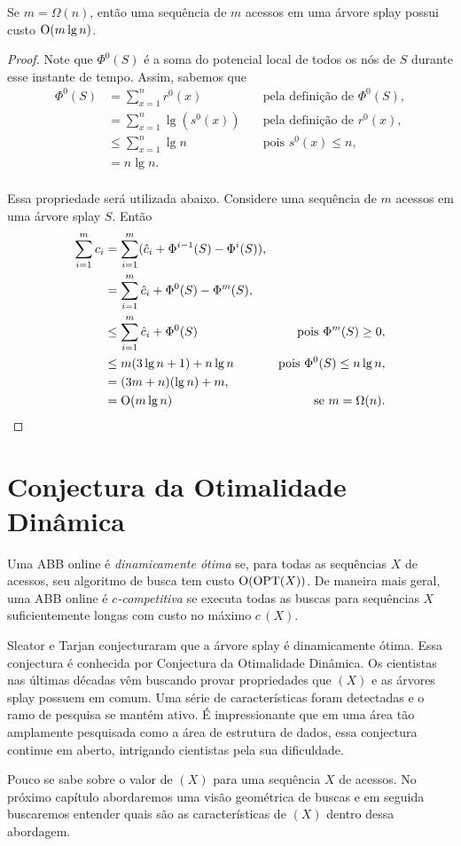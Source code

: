 \begin{theorem}
    Se $m = \Omega(n)$, então uma sequência de $m$ acessos em uma árvore splay possui custo $\mathrm{O}(m \lg n)$.
\end{theorem}

\begin{proof}
Note que $\Phi^{0}(S)$ é a soma do potencial local de todos os nós de $S$ durante esse instante de tempo. Assim, sabemos que 
\begin{align*}
    \Phi^{0}(S) &= \sum_{x = 1}^{n}r^{0}(x) \quad & \text{pela definição de $\Phi^{0}(S)$},\\
    &= \sum_{x = 1}^{n}\lg(s^{0}(x)) \quad & \text{pela definição de $r^{0}(x)$},\\
    &\leq \sum_{x = 1}^{n}\lg n \quad & \text{pois $s^{0}(x) \leq n$},\\
    &= n\lg n.\\
\end{align*}

Essa propriedade será utilizada abaixo. Considere uma sequência de $m$ acessos em uma árvore splay $S$. Então
\begin{align*}
    \sum_{i = 1}^{m} c_i &= \sum_{i = 1}^{m} (\hat{c}_i + \Phi^{i-1}(S) - \Phi^{i}(S)),\\
    &= \sum_{i = 1}^{m} \hat{c}_i + \Phi^{0}(S) - \Phi^{m}(S),\\
    &\leq \sum_{i = 1}^{m} \hat{c}_i + \Phi^{0}(S) \quad & \text{pois $\Phi^{m}(S) \geq 0$},\\
    &\leq m(3\lg n + 1) + n\lg n \quad & \text{pois $\Phi^{0}(S) \leq n\lg n$},\\
    &= (3m + n)(\lg n) + m, \\
    &= \mathrm{O}(m \lg n) \quad & \text{se $m = \Omega(n)$}.
\end{align*}
\end{proof}

\section{Conjectura da Otimalidade Dinâmica}

Uma ABB online é \textit{dinamicamente ótima} se, para todas as sequências $X$ de acessos, seu algoritmo de busca tem custo $\mathrm{O}(\text{\ensuremath{\mathrm{OPT}}}(X))$. De maneira mais geral, uma ABB online é \textit{$c$-competitiva} se executa todas as buscas para sequências $X$ suficientemente longas com custo no máximo $c$\,\OPT$(X)$.

Sleator e Tarjan \cite{selfadjustingbst} conjecturaram que a árvore splay é dinamicamente ótima. Essa conjectura é conhecida por Conjectura da Otimalidade Dinâmica. Os cientistas nas últimas décadas vêm buscando provar propriedades que \OPT$(X)$ e as árvores splay possuem em comum. Uma série de características foram detectadas e o ramo de pesquisa se mantém ativo. É impressionante que em uma área tão amplamente pesquisada como a área de estrutura de dados, essa conjectura continue em aberto, intrigando cientistas pela sua dificuldade.

Pouco se sabe sobre o valor de \OPT$(X)$ para uma sequência $X$ de acessos. No próximo capítulo abordaremos uma visão geométrica de buscas e em seguida buscaremos entender quais são as características de \OPT$(X)$ dentro dessa abordagem. 